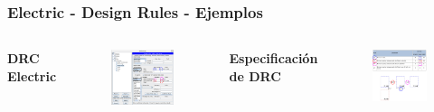 \documentclass{beamer}
\begin{document}
\begin{frame}
\frametitle{Electric - Design Rules - Ejemplos}
\begin{columns}[t] %
\textbf{DRC Electric}
\begin{figure}
\includegraphics[width=0.99\linewidth]{figuras/configuracionElectric-10B.eps}
\end{figure}
\textbf{Especificación de DRC}
\begin{figure}
\includegraphics[width=1.00\linewidth]{figuras/scmos-eps-converted-to.pdf}
\end{figure}

\end{columns}
\end{frame}
\end{document}
